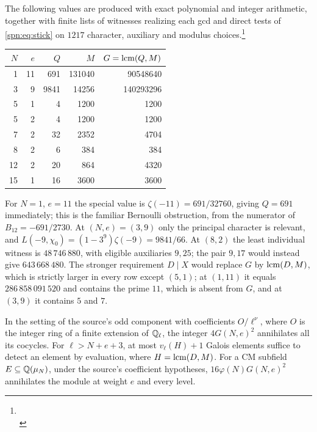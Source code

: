 \begin{example}\label{spn:ex:stick-table}
The following values are produced with exact polynomial and integer
arithmetic, together with finite lists of witnesses realizing each gcd and
direct tests of \eqref{spn:eq:stick} on $1217$ character, auxiliary and
modulus
choices.\footnote{\\
}
\begin{center}
\begin{tabular}{rrrrr}
\toprule
$N$ & $e$ & $Q$ & $M$ & $G=\operatorname{lcm}(Q,M)$\\
\midrule
1&11&691&131040&90548640\\
3&9&9841&14256&140293296\\
5&1&4&1200&1200\\
5&2&4&1200&1200\\
7&2&32&2352&4704\\
8&2&6&384&384\\
12&2&20&864&4320\\
15&1&16&3600&3600\\
\bottomrule
\end{tabular}
\end{center}
For $N=1$, $e=11$ the special value is $\zeta(-11)=691/32760$, giving
$Q=691$ immediately; this is the familiar Bernoulli obstruction, from the
numerator of $B_{12}=-691/2730$. At $(N,e)=(3,9)$ only the principal
character is relevant, and $L(-9,\chi_0)=(1-3^9)\zeta(-9)=9841/66$. At
$(8,2)$ the least individual witness is $48\,746\,880$, with eligible
auxiliaries $9,25$; the pair $9,17$ would instead give $643\,668\,480$. The
stronger requirement $D\mid X$ would replace $G$ by $\operatorname{lcm}(D,M)$, which is
strictly larger in every row except $(5,1)$; at $(1,11)$ it equals
$286\,858\,091\,520$ and contains the prime $11$, which is absent from $G$,
and at $(3,9)$ it contains $5$ and $7$.
\end{example}

\begin{corollary}\label{spn:cor:kill}
In the setting of the source's odd component with coefficients $O/\ell^\nu$,
where $O$ is the integer ring of a finite extension of $\mathbb{Q}_\ell$, the integer
$4G(N,e)^2$ annihilates all its cocycles. For $\ell>N+e+3$, at most
$v_\ell(H)+1$ Galois elements suffice to detect an element by evaluation,
where $H=\operatorname{lcm}(D,M)$. For a CM subfield
$E\subseteq\mathbb{Q}(\mu_N)$, under the source's coefficient hypotheses,
$16\varphi(N)G(N,e)^2$ annihilates the module \textup{} at
weight $e$ and every level.
\end{corollary}

